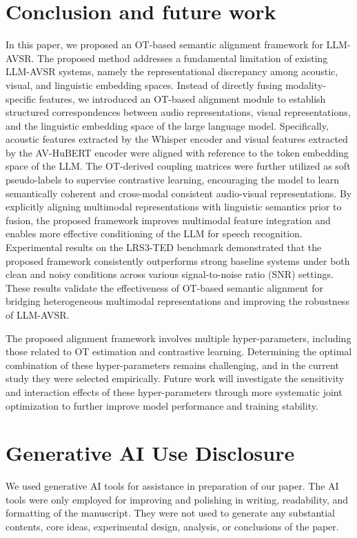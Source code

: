 \documentclass[conference]{IEEEtran}
\begin{document}
\section{Conclusion and future work}
In this paper, we proposed an OT-based semantic alignment framework for LLM-AVSR. The proposed method addresses a fundamental limitation of existing LLM-AVSR systems, namely the representational discrepancy among acoustic, visual, and linguistic embedding spaces. Instead of directly fusing modality-specific features, we introduced an OT-based alignment module to establish structured correspondences between audio representations, visual representations, and the linguistic embedding space of the large language model. Specifically, acoustic features extracted by the Whisper encoder and visual features extracted by the AV-HuBERT encoder were aligned with reference to the token embedding space of the LLM. The OT-derived coupling matrices were further utilized as soft pseudo-labels to supervise contrastive learning, encouraging the model to learn semantically coherent and cross-modal consistent audio-visual representations. By explicitly aligning multimodal representations with linguistic semantics prior to fusion, the proposed framework improves multimodal feature integration and enables more effective conditioning of the LLM for speech recognition. Experimental results on the LRS3-TED benchmark demonstrated that the proposed framework consistently outperforms strong baseline systems under both clean and noisy conditions across various signal-to-noise ratio (SNR) settings. These results validate the effectiveness of OT-based semantic alignment for bridging heterogeneous multimodal representations and improving the robustness of LLM-AVSR.

The proposed alignment framework involves multiple hyper-parameters, including those related to OT estimation and contrastive learning. Determining the optimal combination of these hyper-parameters remains challenging, and in the current study they were selected empirically. Future work will investigate the sensitivity and interaction effects of these hyper-parameters through more systematic joint optimization to further improve model performance and training stability. 

\newpage

\section{Generative AI Use Disclosure}
We used generative AI tools for assistance in preparation of our paper. The AI tools were only employed for improving
and polishing in writing, readability, and formatting of the manuscript. They were not used to generate any substantial contents, core ideas, experimental design, analysis, or conclusions of the paper.
\end{document}
